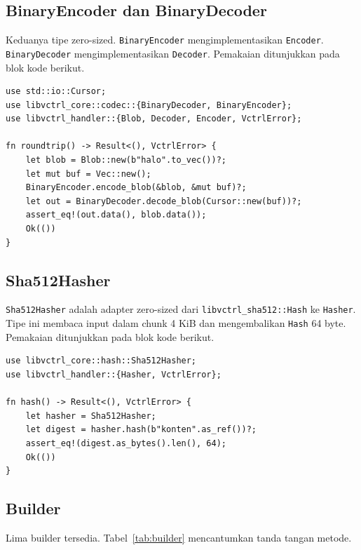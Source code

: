 \documentclass[11pt,a4paper]{article}
\begin{document}
\subsection{BinaryEncoder dan BinaryDecoder}

Keduanya tipe zero-sized. \texttt{BinaryEncoder} mengimplementasikan \texttt{Encoder}. \texttt{BinaryDecoder} mengimplementasikan \texttt{Decoder}. Pemakaian ditunjukkan pada blok kode berikut.

\begin{lstlisting}[style=code]
use std::io::Cursor;
use libvctrl_core::codec::{BinaryDecoder, BinaryEncoder};
use libvctrl_handler::{Blob, Decoder, Encoder, VctrlError};

fn roundtrip() -> Result<(), VctrlError> {
    let blob = Blob::new(b"halo".to_vec())?;
    let mut buf = Vec::new();
    BinaryEncoder.encode_blob(&blob, &mut buf)?;
    let out = BinaryDecoder.decode_blob(Cursor::new(buf))?;
    assert_eq!(out.data(), blob.data());
    Ok(())
}
\end{lstlisting}

\subsection{Sha512Hasher}

\texttt{Sha512Hasher} adalah adapter zero-sized dari \texttt{libvctrl\_sha512::Hash} ke \texttt{Hasher}. Tipe ini membaca input dalam chunk 4 KiB dan mengembalikan \texttt{Hash} 64 byte. Pemakaian ditunjukkan pada blok kode berikut.

\begin{lstlisting}[style=code]
use libvctrl_core::hash::Sha512Hasher;
use libvctrl_handler::{Hasher, VctrlError};

fn hash() -> Result<(), VctrlError> {
    let hasher = Sha512Hasher;
    let digest = hasher.hash(b"konten".as_ref())?;
    assert_eq!(digest.as_bytes().len(), 64);
    Ok(())
}
\end{lstlisting}

\subsection{Builder}

Lima builder tersedia. Tabel~\ref{tab:builder} mencantumkan tanda tangan metode.
\end{document}
